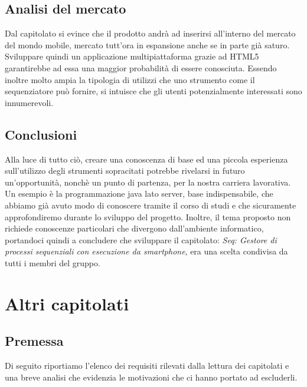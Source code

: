 \subsection{Analisi del mercato}
Dal capitolato si evince che il prodotto andrà ad inserirsi all'interno del mercato del mondo mobile, mercato tutt'ora in espansione anche se in parte già saturo. Sviluppare quindi un applicazione multipiattaforma grazie ad HTML5 garantirebbe ad essa una maggior probabilità di essere conosciuta.
Essendo inoltre molto ampia la tipologia di utilizzi che uno strumento come il sequenziatore può fornire, si intuisce che gli utenti potenzialmente interessati sono innumerevoli.

\subsection{Conclusioni}
 Alla luce di tutto ciò, creare una conoscenza di base ed una piccola esperienza sull'utilizzo degli strumenti sopracitati potrebbe rivelarsi in futuro un'opportunità, nonchè un punto di partenza, per la nostra carriera lavorativa. Un esempio è la programmazione java lato server, base indispensabile, che abbiamo già avuto modo di conoscere tramite il corso di studi e che sicuramente approfondiremo durante lo sviluppo del progetto. Inoltre, il tema proposto non richiede conoscenze particolari che divergono dall'ambiente informatico, portandoci quindi a concludere che sviluppare il capitolato: \textit{Seq: Gestore di processi sequenziali con esecuzione da smartphone}, era una scelta condivisa da tutti i membri del gruppo. \\

\section{Altri capitolati}
\subsection{Premessa}
Di seguito riportiamo l'elenco dei requisiti rilevati dalla lettura dei capitolati e una breve analisi che evidenzia le motivazioni che ci hanno portato ad escluderli.\\
